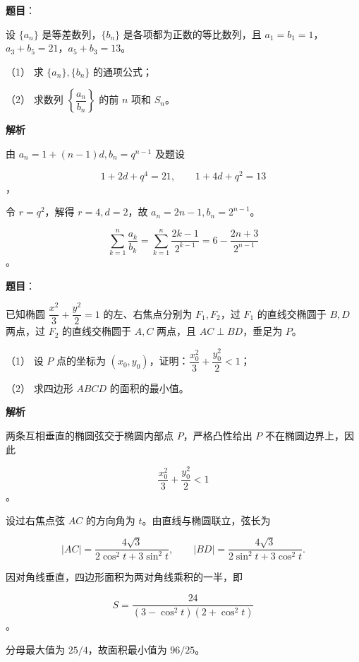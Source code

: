 \begin{answer}

\textbf{题目}：

设 $\{a_n\}$ 是等差数列，$\{b_n\}$ 是各项都为正数的等比数列，且 $a_1=b_1=1$，$a_3+b_5=21$，$a_5+b_3=13$。

（1） 求 $\{a_n\},\{b_n\}$ 的通项公式；

（2） 求数列 $\left\{\dfrac{a_n}{b_n}\right\}$ 的前 $n$ 项和 $S_n$。

\textbf{解析}


由 $a_n=1+(n-1)d,b_n=q^{n-1}$ 及题设

\nopagebreak[4]
\[
1+2d+q^4=21,\qquad 1+4d+q^2=13
\]
，

令 $r=q^2$，解得 $r=4,d=2$，故 $a_n=2n-1,b_n=2^{n-1}$。


\nopagebreak[4]
\[
\sum_{k=1}^n\frac{a_k}{b_k}
=\sum_{k=1}^n\frac{2k-1}{2^{k-1}}
=6-\frac{2n+3}{2^{n-1}}
\]
。



\end{answer}
\begin{answer}

\textbf{题目}：

已知椭圆 $\dfrac{x^2}{3}+\dfrac{y^2}{2}=1$ 的左、右焦点分别为 $F_1,F_2$，过 $F_1$ 的直线交椭圆于 $B,D$ 两点，过 $F_2$ 的直线交椭圆于 $A,C$ 两点，且 $AC\perp BD$，垂足为 $P$。

（1） 设 $P$ 点的坐标为 $(x_0,y_0)$，证明：$\dfrac{x_0^2}{3}+\dfrac{y_0^2}{2}<1$；

（2） 求四边形 $ABCD$ 的面积的最小值。

\textbf{解析}


两条互相垂直的椭圆弦交于椭圆内部点 $P$，严格凸性给出 $P$ 不在椭圆边界上，因此

\nopagebreak[4]
\[
\frac{x_0^2}{3}+\frac{y_0^2}{2}<1
\]
。


设过右焦点弦 $AC$ 的方向角为 $t$。由直线与椭圆联立，弦长为

\nopagebreak[4]
\[
|AC|=\frac{4\sqrt3}{2\cos^2t+3\sin^2t},
\qquad
|BD|=\frac{4\sqrt3}{2\sin^2t+3\cos^2t}.
\]

因对角线垂直，四边形面积为两对角线乘积的一半，即

\nopagebreak[4]
\[
S=\frac{24}{(3-\cos^2t)(2+\cos^2t)}
\]
。

分母最大值为 $25/4$，故面积最小值为 $96/25$。



\end{answer}
